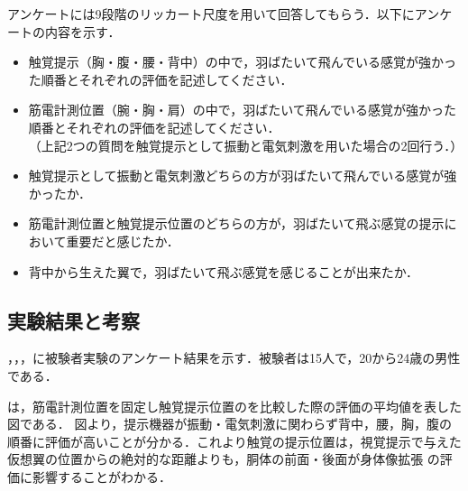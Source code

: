 \begin{small}
        アンケートには9段階のリッカート尺度を用いて回答してもらう．以下にアンケートの内容を示す．
        \begin{itemize}
        \item 触覚提示（胸・腹・腰・背中）の中で，羽ばたいて飛んでいる感覚が強かった順番とそれぞれの評価を記述してください．
        \item 筋電計測位置（腕・胸・肩）の中で，羽ばたいて飛んでいる感覚が強かった順番とそれぞれの評価を記述してください．\\
        （上記2つの質問を触覚提示として振動と電気刺激を用いた場合の2回行う．）
        \item  触覚提示として振動と電気刺激どちらの方が羽ばたいて飛んでいる感覚が強かったか．
        \item 筋電計測位置と触覚提示位置のどちらの方が，羽ばたいて飛ぶ感覚の提示において重要だと感じたか．
        \item 背中から生えた翼で，羽ばたいて飛ぶ感覚を感じることが出来たか．
        \end{itemize}


  \subsection{実験結果と考察}





        ，，，に被験者実験のアンケート結果を示す．被験者は15人で，20から24歳の男性である．

        は，筋電計測位置を固定し触覚提示位置のを比較した際の評価の平均値を表した図である．
        図より，提示機器が振動・電気刺激に関わらず背中，腰，胸，腹の順番に評価が高いことが分かる．これより触覚の提示位置は，視覚提示で与えた仮想翼の位置からの絶対的な距離よりも，胴体の前面・後面が身体像拡張
        の評価に影響することがわかる．


\end{small}
